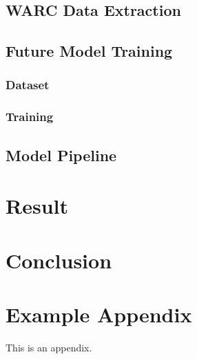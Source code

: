\documentclass[11pt]{article}
\begin{document}
\subsection{WARC Data Extraction}

\subsection{Future Model Training}

\subsubsection{Dataset}

\subsubsection{Training}

\subsection{Model Pipeline}

\section{Result}

\section{Conclusion}



\appendix

\section{Example Appendix}
\label{sec:appendix}

This is an appendix.
\end{document}
